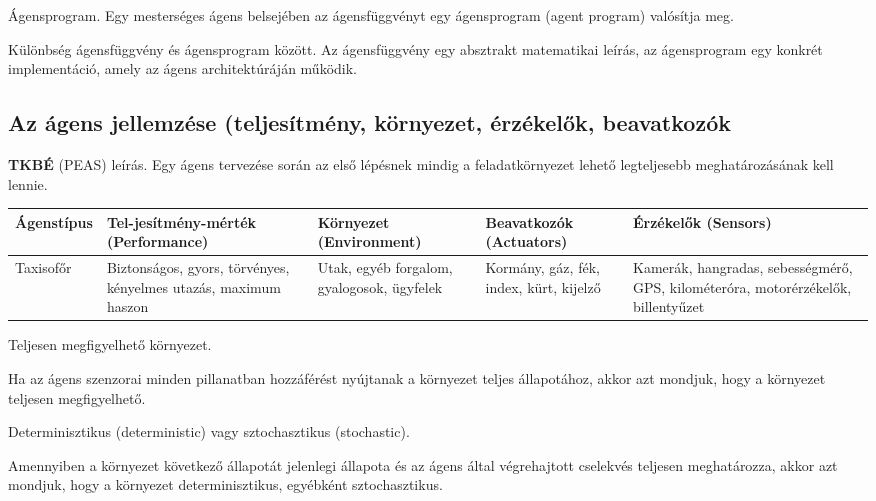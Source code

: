 \begin{definicio}
    Ágensprogram.
    Egy mesterséges ágens belsejében az ágensfüggvényt egy ágensprogram (agent
    program) valósítja meg.
\end{definicio}

\begin{megjegyzes}
    Különbség ágensfüggvény és ágensprogram között.
    Az ágensfüggvény egy absztrakt matematikai leírás, az ágensprogram egy
    konkrét implementáció, amely az ágens architektúráján működik.
\end{megjegyzes}

\subsection{Az ágens jellemzése (teljesítmény, környezet, érzékelők, beavatkozók}

\begin{definicio}
    \textbf{TKBÉ} (PEAS) leírás.
    Egy ágens tervezése során az első lépésnek mindig a feladatkörnyezet lehető
    legteljesebb meghatározásának kell lennie.

            \begin{tabularx}{\textwidth}{|X|X|X|X|X|}
            \hline
            \textbf{Ágenstípus} &
            \textbf{Tel-jesítmény-mérték (Performance)} &
            \textbf{Környezet (Environment)} &
            \textbf{Beavatkozók (Actuators)} &
            \textbf{Érzékelők (Sensors)}
            \\\hline
            Taxisofőr &
            Biztonságos, gyors, törvényes, kényelmes utazás, maximum haszon &
            Utak, egyéb forgalom, gyalogosok, ügyfelek &
            Kormány, gáz, fék, index, kürt, kijelző &
            Kamerák, hangradas, sebességmérő, GPS, kilométeróra, motorérzékelők,
            billentyűzet
            \\\hline
        \end{tabularx}
\end{definicio}

\begin{definicio}
    Teljesen megfigyelhető környezet.

    Ha az ágens szenzorai minden pillanatban hozzáférést nyújtanak a környezet
    teljes állapotához, akkor azt mondjuk, hogy a környezet teljesen
    megfigyelhető.
\end{definicio}

\begin{definicio}
    Determinisztikus (deterministic) vagy sztochasztikus (stochastic).

    Amennyiben a környezet következő állapotát jelenlegi állapota és az ágens
    által végrehajtott cselekvés teljesen meghatározza, akkor azt mondjuk, hogy
    a környezet determinisztikus, egyébként sztochasztikus.
\end{definicio}

